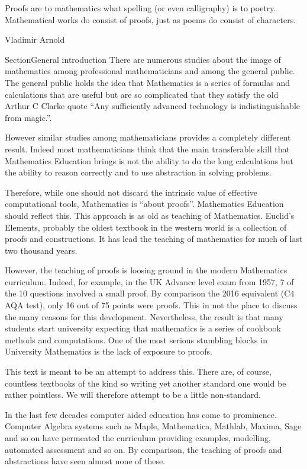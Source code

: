 \preface
\epigraph{Proofs are to mathematics what spelling (or even calligraphy) is to poetry. Mathematical works do consist of proofs, just as poems do consist of characters.}{Vladimir Arnold}
Section{General introduction}
There are numerous studies about the image of mathematics among professional mathematicians and among the general public. The general public holds the idea that Mathematics is a series of formulas and calculations that are useful but are so complicated that they satisfy the old Arthur C Clarke quote ``Any sufficiently advanced technology is indistinguishable from magic.''.

However similar studies among mathematicians provides a completely different result. Indeed most mathematicians think that the main transferable skill that Mathematics Education brings is not the ability to do the long calculations but the ability to reason correctly and to use abstraction in solving problems.

Therefore, while one should not discard the intrinsic value of effective computational tools, Mathematics is ``about proofs''. Mathematics Education should reflect this. This approach is as old as teaching of Mathematics. Euclid's Elements, probably the oldest textbook in the western world is a collection of proofs and constructions. It has lead the teaching of mathematics for much of last two thousand years. 

However, the teaching of proofs is loosing ground  in the modern Mathematics curriculum. Indeed, for example,  in the UK   Advance level exam from 1957,  7 of the 10 questions involved a small proof. By comparison the 2016 equivalent (C4 AQA test), only 16 out of 75 points were proofs. This in not the place to discuss the many reasons for this development. Nevertheless, the result is that many students start university expecting that mathematics  is a series of cookbook methods and computations. One of the most serious stumbling blocks in University Mathematics is the lack of exposure to proofs.

This text is meant to be an attempt to address this. There are, of course, countless textbooks of the kind so writing yet another standard one would be rather pointless. We will  therefore attempt to be a little non-standard.

In the last few decades computer aided education has come to prominence. Computer Algebra systems such as Maple, Mathematica, Mathlab, Maxima, Sage and so on have permeated the curriculum providing examples, modelling, automated assessment and so on. By comparison, the teaching of proofs and abstractions have seen almost none of these.

